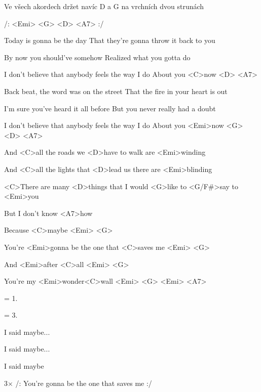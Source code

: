 

Ve všech akordech držet navíc D a G na vrchních dvou strunách

/: <Emi> <G> <D> <A7> :/

\zs
Today is gonna be the day
That they're gonna throw it back to you

By now you should've somehow
Realized what you gotta do

I don't believe that anybody feels the way I do
About you <C>now <D> <A7>
\ks

\zs
Back beat, the word was on the street
That the fire in your heart is out

I'm sure you've heard it all before
But you never really had a doubt

I don't believe that anybody feels the way I do
About you <Emi>now <G> <D> <A7>
\ks

\zs
And <C>all the roads we <D>have to walk are <Emi>winding

And <C>all the lights that <D>lead us there are <Emi>blinding

<C>There are many <D>things that I would <G>like to <G/F#>say to <Emi>you

But I don't know <A7>how
\ks

\zr
Because <C>maybe <Emi> <G>

You're <Emi>gonna be the one that <C>saves me <Emi> <G>

And <Emi>after <C>all <Emi> <G>

You're my <Emi>wonder<C>wall <Emi> <G> <Emi> <A7>
\kr

\zs
= 1.
\ks

\zs
= 3.
\ks

\zr I said maybe... \kr

\zr I said maybe... \kr

\zr
I said maybe

3× /: You're gonna be the one that saves me :/
\kr

\kp
